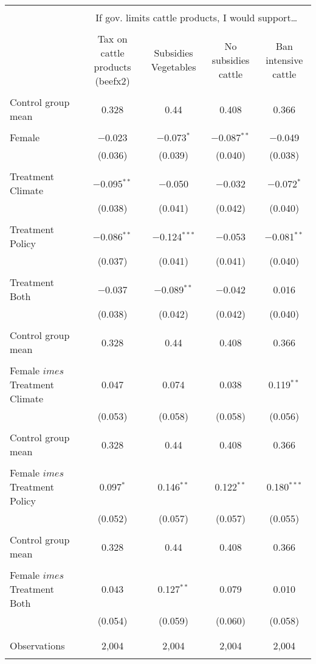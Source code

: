 
\begin{tabular}{@{\extracolsep{5pt}}lcccc} 
\\[-1.8ex]\hline 
\hline \\[-1.8ex] 
 & \multicolumn{4}{c}{If gov. limits cattle products, I would support…} \\ 
\cline{2-5} 
\\[-1.8ex] & Tax on cattle products (beefx2) & Subsidies Vegetables & No subsidies cattle & Ban intensive cattle \\ 
\hline \\[-1.8ex] 
 Control group mean & 0.328 & 0.44 & 0.408 & 0.366  \\ \hline \\[-1.8ex] Female & $-$0.023 & $-$0.073$^{*}$ & $-$0.087$^{**}$ & $-$0.049 \\ 
  & (0.036) & (0.039) & (0.040) & (0.038) \\ 
  & & & & \\ 
 Treatment Climate & $-$0.095$^{**}$ & $-$0.050 & $-$0.032 & $-$0.072$^{*}$ \\ 
  & (0.038) & (0.041) & (0.042) & (0.040) \\ 
  & & & & \\ 
 Treatment Policy & $-$0.086$^{**}$ & $-$0.124$^{***}$ & $-$0.053 & $-$0.081$^{**}$ \\ 
  & (0.037) & (0.041) & (0.041) & (0.040) \\ 
  & & & & \\ 
 Treatment Both & $-$0.037 & $-$0.089$^{**}$ & $-$0.042 & 0.016 \\ 
  & (0.038) & (0.042) & (0.042) & (0.040) \\ 
  & & & & \\ 
 Control group mean & 0.328 & 0.44 & 0.408 & 0.366  \\ \hline \\[-1.8ex] Female $	imes$ Treatment Climate & 0.047 & 0.074 & 0.038 & 0.119$^{**}$ \\ 
  & (0.053) & (0.058) & (0.058) & (0.056) \\ 
  & & & & \\ 
 Control group mean & 0.328 & 0.44 & 0.408 & 0.366  \\ \hline \\[-1.8ex] Female $	imes$ Treatment Policy & 0.097$^{*}$ & 0.146$^{**}$ & 0.122$^{**}$ & 0.180$^{***}$ \\ 
  & (0.052) & (0.057) & (0.057) & (0.055) \\ 
  & & & & \\ 
 Control group mean & 0.328 & 0.44 & 0.408 & 0.366  \\ \hline \\[-1.8ex] Female $	imes$ Treatment Both & 0.043 & 0.127$^{**}$ & 0.079 & 0.010 \\ 
  & (0.054) & (0.059) & (0.060) & (0.058) \\ 
  & & & & \\ 
\hline \\[-1.8ex] 

Observations & 2,004 & 2,004 & 2,004 & 2,004 \\ 
\hline 
\hline \\[-1.8ex] 
\end{tabular} 